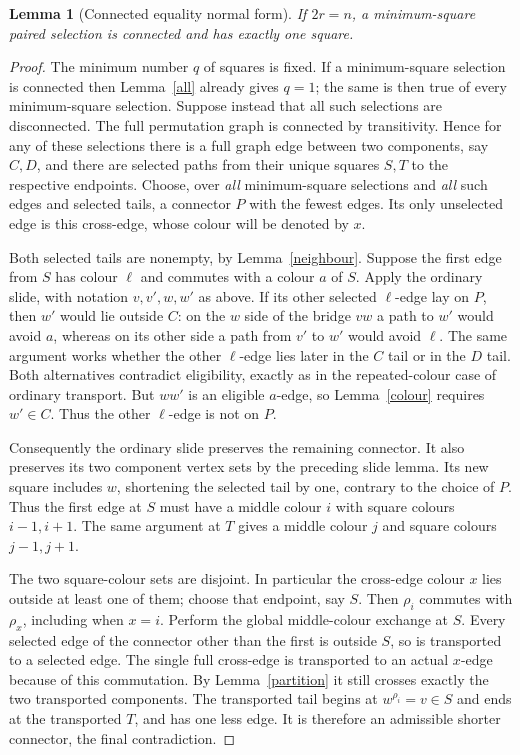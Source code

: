 \documentclass[11pt,a4paper]{article}
\newtheorem{lemma}{Lemma}
\begin{document}
\begin{lemma}[Connected equality normal form]\label{connected}
If $2r=n$, a minimum-square paired selection is connected and has
exactly one square.
\end{lemma}
\begin{proof}
The minimum number $q$ of squares is fixed. If a minimum-square
selection is connected then Lemma~\ref{all} already gives $q=1$;
the same is then true of every minimum-square selection. Suppose
instead that all such selections are disconnected. The full
permutation graph is connected by transitivity. Hence for any of
these selections there is a full graph edge between two components,
say $C,D$, and there are selected paths from their unique squares
$S,T$ to the respective endpoints. Choose, over \emph{all}
minimum-square selections and \emph{all} such edges and selected
tails, a connector $P$ with the fewest edges. Its only unselected
edge is this cross-edge, whose colour will be denoted by $x$.

Both selected tails are nonempty, by Lemma~\ref{neighbour}. Suppose
the first edge from $S$ has colour $\ell$ and commutes with a colour
$a$ of $S$. Apply the ordinary slide, with notation $v,v',w,w'$
as above. If its other selected $\ell$-edge lay on $P$, then $w'$
would lie outside $C$: on the $w$ side of the bridge $vw$ a path
to $w'$ would avoid $a$, whereas on its other side a path from
$v'$ to $w'$ would avoid $\ell$. The same argument works whether
the other $\ell$-edge lies later in the $C$ tail or in the $D$
tail. Both alternatives contradict eligibility, exactly as in the
repeated-colour case of ordinary transport. But $ww'$ is an
eligible $a$-edge, so Lemma~\ref{colour} requires $w'\in C$.
Thus the other $\ell$-edge is not on $P$.

Consequently the ordinary slide preserves the remaining connector.
It also preserves its two component vertex sets by the preceding
slide lemma. Its new square includes $w$, shortening the selected
tail by one, contrary to the choice of $P$. Thus the first edge
at $S$ must have a middle colour $i$ with square colours $i-1,i+1$.
The same argument at $T$ gives a middle colour $j$ and square
colours $j-1,j+1$.

The two square-colour sets are disjoint. In particular the
cross-edge colour $x$ lies outside at least one of them; choose
that endpoint, say $S$. Then $\rho_i$ commutes with $\rho_x$,
including when $x=i$. Perform the global middle-colour exchange
at $S$. Every selected edge of the connector other than the first
is outside $S$, so is transported to a selected edge. The single
full cross-edge is transported to an actual $x$-edge because of
this commutation. By Lemma~\ref{partition} it still crosses exactly
the two transported components. The transported tail begins at
$w^{\rho_i}=v\in S$ and ends at the transported $T$, and has one
less edge. It is therefore an admissible shorter connector, the
final contradiction.
\end{proof}
\end{document}
